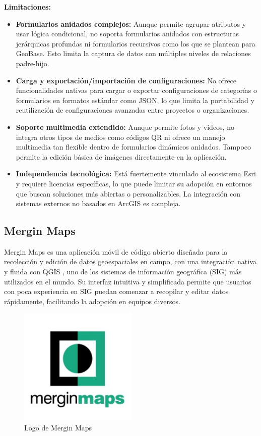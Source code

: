 \documentclass[12pt, a4paper]{book}
\begin{document}
\textbf{Limitaciones:}
\begin{itemize}
  \item \textbf{Formularios anidados complejos:} Aunque permite agrupar atributos y usar lógica condicional, no soporta formularios anidados con estructuras jerárquicas profundas ni formularios recursivos como los que se plantean para GeoBase. Esto limita la captura de datos con múltiples niveles de relaciones padre-hijo.
  
  \item \textbf{Carga y exportación/importación de configuraciones:} No ofrece funcionalidades nativas para cargar o exportar configuraciones de categorías o formularios en formatos estándar como JSON, lo que limita la portabilidad y reutilización de configuraciones avanzadas entre proyectos o organizaciones.
  
  \item \textbf{Soporte multimedia extendido:} Aunque permite fotos y videos, no integra otros tipos de medios como códigos QR ni ofrece un manejo multimedia tan flexible dentro de formularios dinámicos anidados. Tampoco permite la edición básica de imágenes directamente en la aplicación.
  
  \item \textbf{Independencia tecnológica:} Está fuertemente vinculado al ecosistema Esri y requiere licencias específicas, lo que puede limitar su adopción en entornos que buscan soluciones más abiertas o personalizables. La integración con sistemas externos no basados en ArcGIS es compleja.
\end{itemize}

\subsection{Mergin Maps}

Mergin Maps \cite{merginmapsdocs} es una aplicación móvil de código abierto diseñada para la recolección y edición de datos geoespaciales en campo, con una integración nativa y fluida con QGIS \cite{qgisdocs}, uno de los sistemas de información geográfica (SIG) más utilizados en el mundo. Su interfaz intuitiva y simplificada permite que usuarios con poca experiencia en SIG puedan comenzar a recopilar y editar datos rápidamente, facilitando la adopción en equipos diversos.

\begin{figure}[h]
  \centering
  \includegraphics[width=0.5\textwidth]{images/mergin_maps.jpeg}
  \caption{Logo de Mergin Maps}
  \label{fig:merginlogo}
\end{figure}
\end{document}
